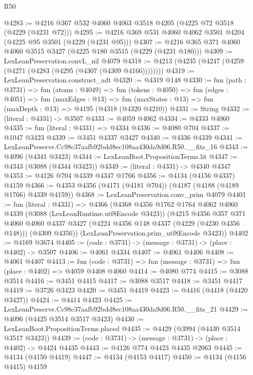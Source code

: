 \begin{lexlean}{R50}
\begin{coremodule}
@4283 := @4216 @367 @532 @4060 @4063 @3518 @4205 (@4225 @72 @3518 (@4229 (@4231 @72)))
@4295 := @4216 @369 @531 @4060 @4062 @3501 @4204 (@4225 @95 @3501 (@4229 (@4231 @95)))
@4307 := @4216 @365 @371 @4060 @4060 @3515 @3427 (@4225 @180 @3515 (@4229 (@4231 @180)))
@4309 := LexLeanPreservation.convL_nil @4079
@4318 := @4213 (@4235 (@4247 (@4259 (@4271 (@4283 (@4295 (@4307 (@4309 @4166))))))))
@4319 := LexLeanPreservation.construct_adt
@4320 := @4319 @148
@4330 := fun (path : @3731) =>
  fun (atoms : @4049) =>
  fun (tokens : @4050) =>
  fun (edges : @4051) =>
  fun (maxEdges : @13) =>
  fun (maxStates : @13) => fun (maxDepth : @13) => @4195 (@4318 (@4320 @4210))
@4331 := String
@4332 := (literal : @4331) -> @3507
@4333 := @4059 @4062
@4334 := @4333 @4060
@4335 := fun (literal : @4331) => @4334
@4336 := @4080 @704
@4337 := @1047 @3423
@4339 := @3451 @4337 @3427
@4340 := @4336 @4339
@4341 := LexLeanPreserve.Cc98c37aafb92bdd8ec108aa430da9d06.R50.__fits_16
@4343 := @4096 (@4341 @3423)
@4344 := LexLeanBoot.PropositionTerms.lit
@4347 := @4343 (@3088 (@4344 @3423))
@4349 := (literal : @4331) -> @4340 @4347
@4353 := @4126 @704 @4339 @4347 @1766
@4356 := @4134 (@4156 @4337) @4159
@4366 := @4353 @4356 (@4171 (@4181 @704)) (@4187 (@4188 (@4189 @1766) @4339 @4159))
@4368 := LexLeanPreservation.conv_prim @4079
@4401 := fun (literal : @4331) =>
  @4366
    (@4368
      @4356
      @1762
      @1764
      @4062
      @4060
      @4339
      (@3088 (LexLeanRuntime.utf8Encode @3423))
      (@4215
        @4356
        @357
        @371
        @4060
        @4060
        @4337
        @3427
        (@4224 @4356 @148 @4337 (@4229 (@4230 @4356 @148)))
        (@4309 @4356))
      (LexLeanPreservation.prim_utf8Encode @3423))
@4402 := @4169 @3674
@4405 := (code : @3731) -> (message : @3731) -> (place : @4402) -> @3507
@4406 := @4061 @4334
@4407 := @4061 @4406
@4408 := @4061 @4407
@4413 := fun (code : @3731) => fun (message : @3731) => fun (place : @4402) => @4059 @4408 @4060
@4414 := @4080 @774
@4415 := @3088 @3514
@4416 := @3451 @4415
@4417 := @3088 @3517
@4418 := @3451 @4417
@4419 := @3726 @3423
@4420 := @3451 @4419
@4423 := @4416 (@4418 (@4420 @3427))
@4424 := @4414 @4423
@4425 := LexLeanPreserve.Cc98c37aafb92bdd8ec108aa430da9d06.R50.__fits_21
@4429 := @4096 (@4425 @3514 @3517 @3423)
@4430 := LexLeanBoot.PropositionTerms.placed
@4435 := @4429 (@3994 (@4430 @3514 @3517 @3423))
@4439 := (code : @3731) -> (message : @3731) -> (place : @4402) -> @4424 @4435
@4443 := @4126 @774 @4423 @4435 @2063
@4445 := @4134 (@4150 @4419)
@4447 := @4134 (@4153 @4417)
@4450 := @4134 (@4156 @4415) @4159

\end{coremodule}
\end{lexlean}
